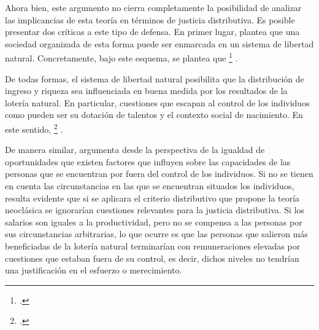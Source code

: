 Ahora bien, este argumento no cierra completamente la posibilidad de analizar las implicancias de esta teoría en términos de justicia distributiva. Es posible presentar dos críticas a este tipo de defensa. En primer lugar, \citet{Rawls_1971} plantea que una sociedad organizada de esta forma puede ser enmarcada en un sistema de libertad natural. Concretamente, bajo este esquema, se plantea que \footnote{ \citep[p. 66]{Rawls_1971}.} \citep[p. 66]{Rawls_1971}.

De todas formas, el sistema de libertad natural posibilita que la distribución de ingreso y riqueza sea influenciada en buena medida por los resultados de la lotería natural. En particular, cuestiones que escapan al control de los individuos como pueden ser su dotación de talentos y el contexto social de nacimiento. En este sentido, \footnote{ \citep[p. 72]{Rawls_1971}.} \citep[p. 72]{Rawls_1971}. 

De manera similar, \citet{Roemer_1998} argumenta desde la perspectiva de la igualdad de oportunidades que existen factores que influyen sobre las capacidades de las personas que se encuentran por fuera del control de los individuos. Si no se tienen en cuenta las circunstancias en las que se encuentran situados los individuos, resulta evidente que si se aplicara el criterio distributivo que propone la teoría neoclásica se ignorarían cuestiones relevantes para la justicia distributiva. Si los salarios son iguales a la productividad, pero no se compensa a las personas por sus circunstancias arbitrarias, lo que ocurre es que las personas que salieron más beneficiadas de la lotería natural terminarían con remuneraciones elevadas por cuestiones que estaban fuera de su control, es decir, dichos niveles no tendrían una justificación en el esfuerzo o merecimiento.


